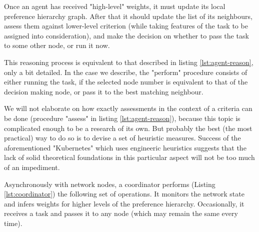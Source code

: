 Once an agent has received "high-level" weights, it must update its local preference hierarchy graph.
After that it should update the list of its neighbours, assess them against lower-level criterion (while taking features of the task to be assigned into consideration), and make the decision on whether to pass the task to some other node, or run it now.

This reasoning process is equivalent to that described in listing \ref{lst:agent-reason}, only a bit detailed.
In the case we describe, the "perform" procedure consists of either running the task, if the selected node number is equivalent to that of the decision making node, or pass it to the best matching neighbour.

We will not elaborate on how exactly assessments in the context of a criteria can be done (procedure "assess" in listing \ref{lst:agent-reason}), because this topic is complicated enough to be a research of its own.
But probably the best (the most practical) way to do so is to devise a set of heuristic measures.
Success of the aforementioned "Kubernetes" which uses engineeric heuristics suggests that the lack of solid theoretical foundations in this particular aspect will not be too much of an impediment.

Asynchronously with network nodes, a coordinator performs (Listing \ref{lst:coordinator}) the following set of operations.
It monitors the network state and infers weights for higher levels of the preference hierarchy.
Occasionally, it receives a task and passes it to any node (which may remain the same every time).
